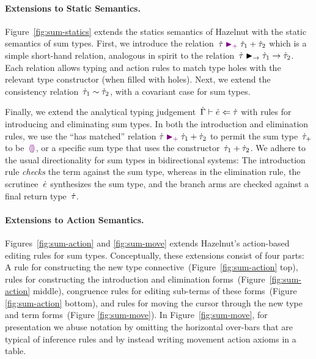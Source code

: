 \paragraph{Extensions to Static Semantics.}
Figure~\ref{fig:sum-statics} extends the statics semantics of Hazelnut
with the static semantics of sum types.
%
First, we introduce the
relation~$\dot{\tau} \mathrel{\textcolor{violet}{\blacktriangleright_{+}}} {\dot{\tau}_1} + {\dot{\tau}_2}$ which is a
simple short-hand relation, analogous in spirit to the
relation~$\dot{\tau} \blacktriangleright_{\rightarrow} \dot{\tau}_1 \rightarrow \dot{\tau}_2$.  Each relation
allows typing and action rules to match type holes with the relevant
type constructor (when filled with holes).
%
Next, we extend the consistency relation~$\dot{\tau}_1 \sim \dot{\tau}_2$,
with a covariant case for sum types.

Finally, we extend the analytical typing
judgement~$\dot{\Gamma} \vdash \dot{e} \Leftarrow \dot{\tau}$ with rules for introducing
and eliminating sum types.
%
In both the introduction and elimination rules, we use the ``has
matched'' relation $\dot{\tau} \mathrel{\textcolor{violet}{\blacktriangleright_{+}}} {\dot{\tau}_1} + {\dot{\tau}_2}$ to
permit the sum type~$\dot{\tau}_+$ to be~$\textcolor{violet}{\llparenthesis}\textcolor{violet}{\rrparenthesis}$, or a specific sum type
that uses the constructor~$\dot{\tau}_1 + \dot{\tau}_2$.
%
We adhere to the usual directionality for sum types in bidirectional
 systems: The introduction rule \emph{checks} the term against the sum
 type, whereas in the elimination rule, the scrutinee~$\dot{e}$
 synthesizes the sum type, and the branch arms are checked against a
 final return type~$\dot{\tau}$.
%


\paragraph{Extensions to Action Semantics.}
Figures~\ref{fig:sum-action} and \ref{fig:sum-move} extends Hazelnut's
action-based editing rules for sum types.
%
Conceptually, these extensions consist of four parts: A rule for
constructing the new type connective~(Figure~\ref{fig:sum-action}
top), rules for constructing the introduction and elimination
forms~(Figure~\ref{fig:sum-action} middle), congruence rules for
editing sub-terms of these forms~(Figure \ref{fig:sum-action} bottom),
and rules for moving the cursor through the new type and term
forms~(Figure \ref{fig:sum-move}).  In Figure~\ref{fig:sum-move}, for
presentation we abuse notation by omitting the horizontal over-bars
that are typical of inference rules and by instead writing movement
action axioms in a table.


